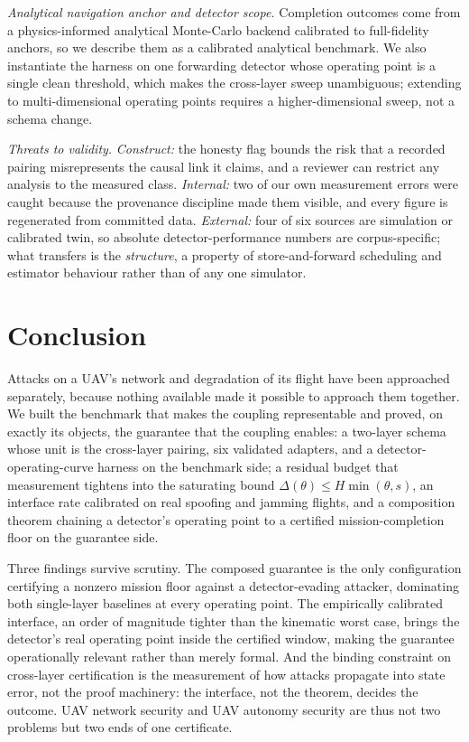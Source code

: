 \emph{Analytical navigation anchor and detector scope.} Completion outcomes come
from a physics-informed analytical Monte-Carlo backend calibrated to
full-fidelity anchors, so we describe them as a calibrated analytical benchmark.
We also instantiate the harness on one forwarding detector whose operating point
is a single clean threshold, which makes the cross-layer sweep unambiguous;
extending to multi-dimensional operating points requires a higher-dimensional
sweep, not a schema change.

\emph{Threats to validity.} \emph{Construct:} the honesty flag bounds the risk
that a recorded pairing misrepresents the causal link it claims, and a reviewer
can restrict any analysis to the measured class. \emph{Internal:} two of our own
measurement errors were caught because the provenance discipline made them
visible, and every figure is regenerated from committed data. \emph{External:}
four of six sources are simulation or calibrated twin, so absolute
detector-performance numbers are corpus-specific; what transfers is the
\emph{structure}, a property of store-and-forward scheduling and estimator
behaviour rather than of any one simulator.

\section{Conclusion}
\label{sec:conclusion}
Attacks on a UAV's network and degradation of its flight have been approached
separately, because nothing available made it possible to approach them
together. We built the benchmark that makes the coupling representable and
proved, on exactly its objects, the guarantee that the coupling enables: a two-layer schema whose unit
is the cross-layer pairing, six validated adapters, and a
detector-operating-curve harness on the benchmark side; a residual budget that
measurement tightens into the saturating bound $\Delta(\theta)\le
H\min(\theta,s)$, an interface rate calibrated on real spoofing and jamming
flights, and a composition theorem chaining a detector's operating point to a
certified mission-completion floor on the guarantee side.

Three findings survive scrutiny. The composed guarantee is the only
configuration certifying a nonzero mission floor against a detector-evading
attacker, dominating both single-layer baselines at every operating point. The
empirically calibrated interface, an order of magnitude tighter than the
kinematic worst case, brings the detector's real operating point inside the
certified window, making the guarantee operationally relevant rather than merely
formal. And the binding constraint on cross-layer certification is the
measurement of how attacks propagate into state error, not the proof machinery:
the interface, not the theorem, decides the outcome. UAV network security and
UAV autonomy security are thus not two problems but two ends of one
certificate.

